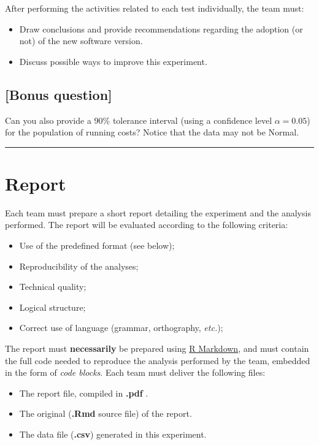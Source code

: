 \documentclass[letter,11pt,twoside,printwatermark=false]{pinp}
\providecommand{\tightlist}{%
  \setlength{\itemsep}{0pt}\setlength{\parskip}{0pt}}
\begin{document}
After performing the activities related to each test individually, the
team must:

\begin{itemize}
\tightlist
\item
  Draw conclusions and provide recommendations regarding the adoption
  (or not) of the new software version.
\item
  Discuss possible ways to improve this experiment.
\end{itemize}

\subsection{{[}Bonus question{]}}\label{bonus-question}

Can you also provide a 90\% tolerance interval (using a confidence level
\(\alpha = 0.05\)) for the population of running costs? Notice that the
data may not be Normal.

\begin{center}\rule{0.5\linewidth}{\linethickness}\end{center}

\newpage

\section{Report}\label{report}

Each team must prepare a short report detailing the experiment and the
analysis performed. The report will be evaluated according to the
following criteria:

\begin{itemize}
\tightlist
\item
  Use of the predefined format (see below);
\item
  Reproducibility of the analyses;
\item
  Technical quality;
\item
  Logical structure;
\item
  Correct use of language (grammar, orthography, \emph{etc.});
\end{itemize}

The report must \textbf{necessarily} be prepared using
\href{http://rmarkdown.rstudio.com}{R Markdown}, and must contain the
full code needed to reproduce the analysis performed by the team,
embedded in the form of \emph{code blocks}. Each team must deliver the
following files:

\begin{itemize}
\tightlist
\item
  The report file, compiled in \textbf{.pdf} .
\item
  The original (\textbf{.Rmd} source file) of the report.
\item
  The data file (\textbf{.csv}) generated in this experiment.
\end{itemize}
\end{document}
